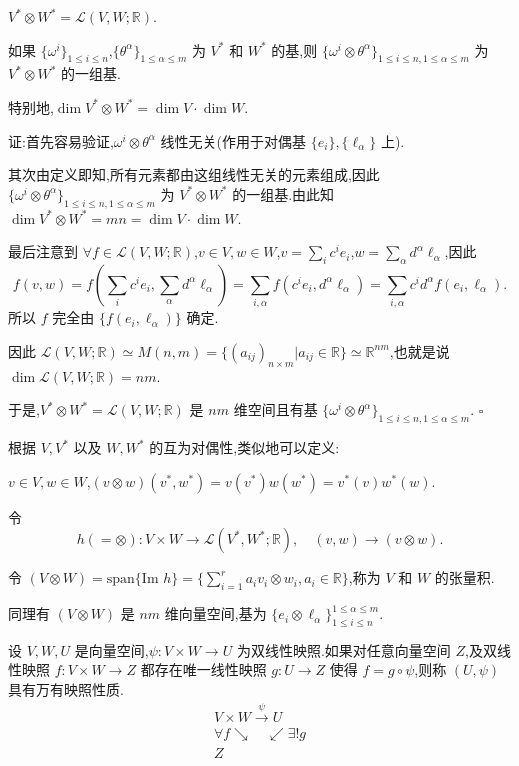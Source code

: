 \begin{proposition}
$V^* \otimes W^* = \mathcal{L}(V, W; \mathbb{R})$.

如果 $\{\omega^i\}_{1 \leq i \leq n}$,$\{\theta^\alpha\}_{1 \leq \alpha \leq m}$ 为 $V^*$ 和 $W^*$ 的基,则 $\{\omega^i \otimes \theta^\alpha\}_{1 \leq i \leq n, 1 \leq \alpha \leq m}$ 为 $V^* \otimes W^*$ 的一组基.

特别地,$\dim V^* \otimes W^* = \dim V \cdot \dim W$.
\end{proposition}

证:首先容易验证,$\omega^i \otimes \theta^\alpha$ 线性无关(作用于对偶基 $\{e_i\}, \{\ell_\alpha\}$ 上).

其次由定义即知,所有元素都由这组线性无关的元素组成,因此 $\{\omega^i \otimes \theta^\alpha\}_{1 \leq i \leq n, 1 \leq \alpha \leq m}$ 为 $V^* \otimes W^*$ 的一组基.由此知 $\dim V^* \otimes W^* = mn = \dim V \cdot \dim W$.

最后注意到 $\forall f \in \mathcal{L}(V, W; \mathbb{R})$,$v \in V, w \in W$,$v = \sum_{i} c^ie_i$,$w = \sum_{\alpha} d^{\alpha} \ell_\alpha$,因此
\[
f(v, w) = f(\sum_{i} c^ie_i, \sum_{\alpha} d^{\alpha} \ell_\alpha) = \sum_{i, \alpha} f(c^ie_i, d^{\alpha} \ell_\alpha) = \sum_{i, \alpha} c^i d^{\alpha} f(e_i, \ell_\alpha).
\]
所以 $f$ 完全由 $\{f(e_i, \ell_\alpha)\}$ 确定.

因此 $\mathcal{L}(V, W; \mathbb{R}) \simeq M(n, m) = \{(a_{ij})_{n \times m}|a_{ij} \in \mathbb{R}\} \simeq \mathbb{R}^{nm}$,也就是说 $\dim \mathcal{L}(V, W; \mathbb{R}) = nm$.

于是,$V^* \otimes W^* = \mathcal{L}(V, W; \mathbb{R})$ 是 $nm$ 维空间且有基 $\{\omega^i \otimes \theta^\alpha\}_{1 \leq i \leq n, 1 \leq \alpha \leq m}$. $\square$

根据 $V, V^*$ 以及 $W, W^*$ 的互为对偶性,类似地可以定义:

$v \in V, w \in W$,$(v \otimes w)(v^*, w^*) = v(v^*)w(w^*) = v^*(v)w^*(w)$.

令
\[
h(=\otimes):V \times W \rightarrow \mathcal{L}(V^*,W^*;\mathbb{R}), \quad (v,w) \rightarrow (v \otimes w).
\]

令 $(V \otimes W) = \text{span}\{\text{Im } h\} = \{\sum_{i=1}^r a_i v_i \otimes w_i, a_i \in \mathbb{R}\}$,称为 $V$ 和 $W$ 的张量积.

同理有 $(V \otimes W)$ 是 $nm$ 维向量空间,基为 $\{e_i \otimes \ell_{\alpha}\}_{1 \leq i \leq n}^{1 \leq \alpha \leq m}$.

\begin{definition}
设 $V, W, U$ 是向量空间,$\psi: V \times W \rightarrow U$ 为双线性映照.如果对任意向量空间 $Z$,及双线性映照 $f: V \times W \rightarrow Z$ 都存在唯一线性映照 $g: U \rightarrow Z$ 使得 $f = g \circ \psi$,则称 $(U,\psi)$ 具有万有映照性质.
\[
\begin{array}{c}
V \times W \xrightarrow{\psi} U \\
\forall f \searrow \quad \swarrow \exists ! g \\
Z
\end{array}
\]
\end{definition}

